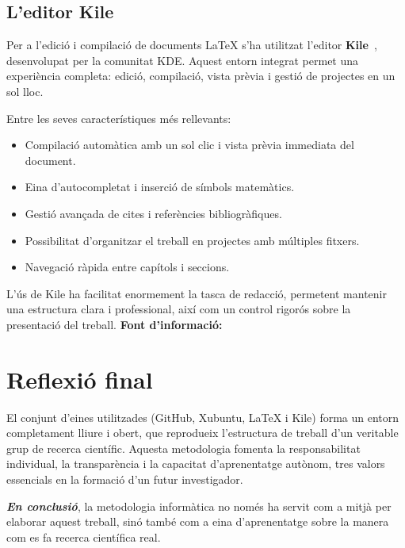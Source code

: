 \subsection{L’editor Kile}
Per a l’edició i compilació de documents LaTeX s’ha utilitzat l’editor \textbf{Kile}~\cite{kile}, desenvolupat per la comunitat KDE. Aquest entorn integrat permet una experiència completa: edició, compilació, vista prèvia i gestió de projectes en un sol lloc.

Entre les seves característiques més rellevants:
\begin{itemize}
  \item Compilació automàtica amb un sol clic i vista prèvia immediata del document.
  \item Eina d’autocompletat i inserció de símbols matemàtics.
  \item Gestió avançada de cites i referències bibliogràfiques.
  \item Possibilitat d’organitzar el treball en projectes amb múltiples fitxers.
  \item Navegació ràpida entre capítols i seccions.
\end{itemize}

L’ús de Kile ha facilitat enormement la tasca de redacció, permetent mantenir una estructura clara i professional, així com un control rigorós sobre la presentació del treball.
\textbf{Font d'informació:} \cite{A5}
\section{Reflexió final}
El conjunt d’eines utilitzades (GitHub, Xubuntu, LaTeX i Kile) forma un entorn completament lliure i obert, que reprodueix l’estructura de treball d’un veritable grup de recerca científic. Aquesta metodologia fomenta la responsabilitat individual, la transparència i la capacitat d’aprenentatge autònom, tres valors essencials en la formació d’un futur investigador.

\textit{\textbf{En conclusió}}, la metodologia informàtica no només ha servit com a mitjà per elaborar aquest treball, sinó també com a eina d’aprenentatge sobre la manera com es fa recerca científica real.
